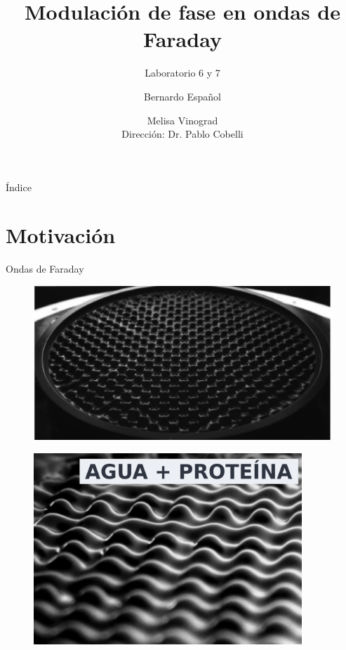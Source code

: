 \documentclass[aspectratio=169]{beamer}
\title{Modulación de fase en ondas de Faraday}
\subtitle{Laboratorio 6 y 7}
\author{
	Bernardo Español \and Melisa Vinograd
	\texorpdfstring{\\ \vspace{0.1cm} Dirección: Dr. Pablo Cobelli}{}
}
\institute{Laboratorio de Turbulencia Geofísica, FLiP: Fluidos y Plasmas}
\date{}
\begin{document}
\begin{frame}
	\titlepage
\end{frame}

\begin{frame}{Índice}
	\tableofcontents
\end{frame}


\section{Motivación}

\begin{frame}{Ondas de Faraday}
	\begin{minipage}{0.65\textwidth}
	  \begin{figure}
		\includegraphics[width=1\textwidth]{figs/shats_snapshot_faraday_c.png}
	  \end{figure}
	\end{minipage} \hfill
	\begin{minipage}{0.3\textwidth}
	  \begin{figure}
	    \includegraphics[width=0.9\textwidth]{figs/shats_snapshot_water+prote.png}\\

\end{figure}
\end{minipage}
\end{frame}
\end{document}
